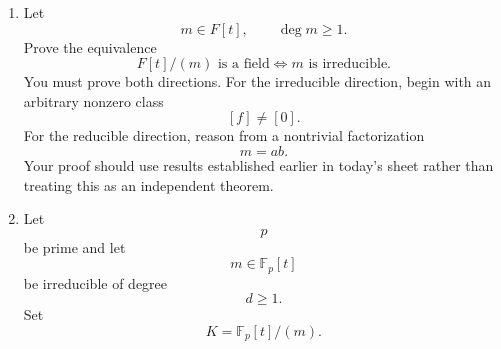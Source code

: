 \documentclass[12pt]{article}
\begin{document}
\begin{enumerate}
\begin{enumerate}[(a)]
          \item
                Prove uniqueness:
                if
                \[
                f
                =
                u\pi_1\cdots\pi_r
                =
                v\rho_1\cdots\rho_s,
                \]where
                \[
                u,v\in F^\times
                \]and all \(\pi_i,\rho_j\) are irreducible, prove that
                \[
                r=s
                \]and, after reordering, each \(\pi_i\) is associate to \(\rho_i\).
        \end{enumerate}
        Conclude that every monic nonconstant polynomial has a unique factorization into monic irreducible polynomials, up to ordering.
  \item
        Let
        \[
        m\in F[t],
        \qquad
        \deg m\ge1.
        \]Prove the equivalence
        \[
        \boxed{
        F[t]/(m)\text{ is a field}
        \iff
        m\text{ is irreducible}.
        }
        \]You must prove both directions.
        For the irreducible direction, begin with an arbitrary nonzero class
        \[
        [f]\neq[0].
        \]For the reducible direction, reason from a nontrivial factorization
        \[
        m=ab.
        \]Your proof should use results established earlier in today's sheet rather than treating this as an independent theorem.
  \item
        Let
        \[
        p
        \]be prime and let
        \[
        m\in\mathbb F_p[t]
        \]be irreducible of degree
        \[
        d\ge1.
        \]Set
        \[
        K=\mathbb F_p[t]/(m).
        \]


\end{enumerate}
\end{document}
